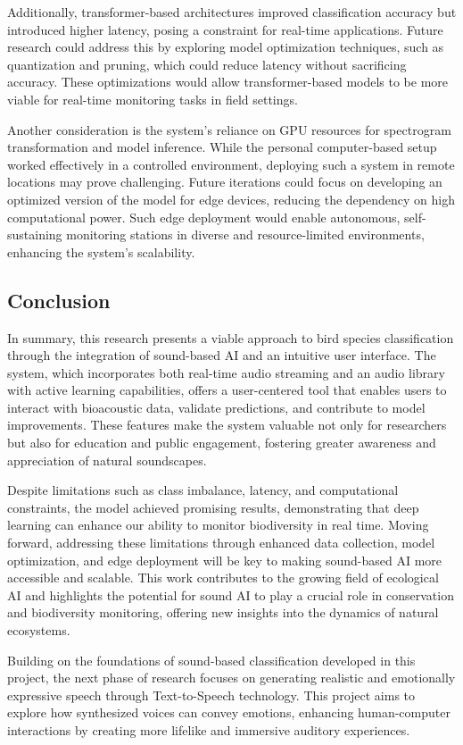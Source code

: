 Additionally, transformer-based architectures improved classification accuracy but introduced higher latency, posing a constraint for real-time applications. Future research could address this by exploring model optimization techniques, such as quantization and pruning, which could reduce latency without sacrificing accuracy. These optimizations would allow transformer-based models to be more viable for real-time monitoring tasks in field settings.

Another consideration is the system's reliance on GPU resources for spectrogram transformation and model inference. While the personal computer-based setup worked effectively in a controlled environment, deploying such a system in remote locations may prove challenging. Future iterations could focus on developing an optimized version of the model for edge devices, reducing the dependency on high computational power. Such edge deployment would enable autonomous, self-sustaining monitoring stations in diverse and resource-limited environments, enhancing the system’s scalability.

\subsection{Conclusion}
In summary, this research presents a viable approach to bird species classification through the integration of sound-based AI and an intuitive user interface. The system, which incorporates both real-time audio streaming and an audio library with active learning capabilities, offers a user-centered tool that enables users to interact with bioacoustic data, validate predictions, and contribute to model improvements. These features make the system valuable not only for researchers but also for education and public engagement, fostering greater awareness and appreciation of natural soundscapes.

Despite limitations such as class imbalance, latency, and computational constraints, the model achieved promising results, demonstrating that deep learning can enhance our ability to monitor biodiversity in real time. Moving forward, addressing these limitations through enhanced data collection, model optimization, and edge deployment will be key to making sound-based AI more accessible and scalable. This work contributes to the growing field of ecological AI and highlights the potential for sound AI to play a crucial role in conservation and biodiversity monitoring, offering new insights into the dynamics of natural ecosystems.

Building on the foundations of sound-based classification developed in this project, the next phase of research focuses on generating realistic and emotionally expressive speech through Text-to-Speech technology. This project aims to explore how synthesized voices can convey emotions, enhancing human-computer interactions by creating more lifelike and immersive auditory experiences.

